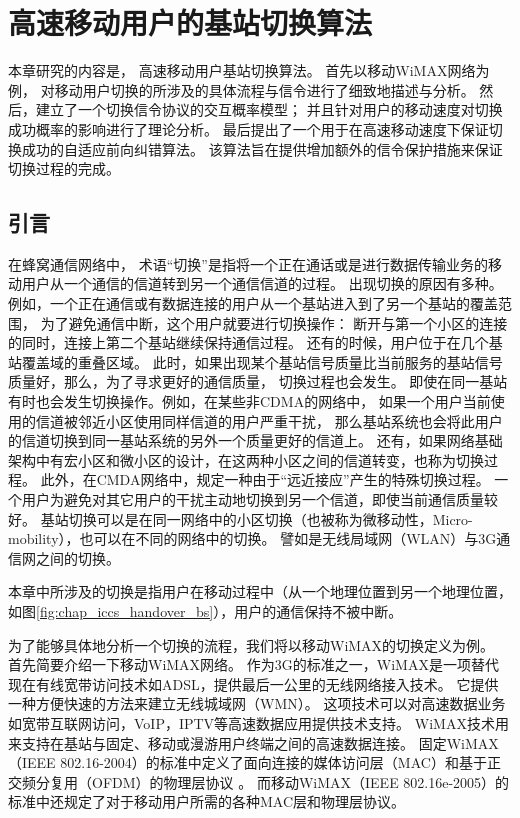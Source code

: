 \graphicspath{ {../body/handover_figures/}}
\chapter{高速移动用户的基站切换算法}
\label{chap_iccs_handover_alogrithm}
本章研究的内容是，
高速移动用户基站切换算法。
首先以移动WiMAX网络为例，
对移动用户切换的所涉及的具体流程与信令进行了细致地描述与分析。
然后，建立了一个切换信令协议的交互概率模型；
并且针对用户的移动速度对切换成功概率的影响进行了理论分析。
最后提出了一个用于在高速移动速度下保证切换成功的自适应前向纠错算法。
该算法旨在提供增加额外的信令保护措施来保证切换过程的完成。


\section{引言}
\label{section_iccs_handover_algorithm_introduction}
在蜂窝通信网络中，
术语“切换”是指将一个正在通话或是进行数据传输业务的移动用户从一个通信的信道转到另一个通信信道的过程。
出现切换的原因有多种。
例如，一个正在通信或有数据连接的用户从一个基站进入到了另一个基站的覆盖范围，
为了避免通信中断，这个用户就要进行切换操作：
断开与第一个小区的连接的同时，连接上第二个基站继续保持通信过程。
还有的时候，用户位于在几个基站覆盖域的重叠区域。
此时，如果出现某个基站信号质量比当前服务的基站信号质量好，那么，为了寻求更好的通信质量，
切换过程也会发生。
即使在同一基站有时也会发生切换操作。例如，在某些非CDMA的网络中，
如果一个用户当前使用的信道被邻近小区使用同样信道的用户严重干扰，
那么基站系统也会将此用户的信道切换到同一基站系统的另外一个质量更好的信道上。
还有，如果网络基础架构中有宏小区和微小区的设计，在这两种小区之间的信道转变，也称为切换过程。
此外，在CMDA网络中，规定一种由于“远近接应”产生的特殊切换过程。
一个用户为避免对其它用户的干扰主动地切换到另一个信道，即使当前通信质量较好。
基站切换可以是在同一网络中的小区切换（也被称为微移动性，Micro-mobility），也可以在不同的网络中的切换。
譬如是无线局域网（WLAN）与3G通信网之间的切换。

本章中所涉及的切换是指用户在移动过程中（从一个地理位置到另一个地理位置，如图\ref{fig:chap_iccs_handover_bs}），用户的通信保持不被中断\cite{Pollini:1996:THD}\cite{Wright:ICMB2007}。

为了能够具体地分析一个切换的流程，我们将以移动WiMAX的切换定义为例。
首先简要介绍一下移动WiMAX网络。
作为3G的标准之一，WiMAX是一项替代现在有线宽带访问技术如ADSL，提供最后一公里的无线网络接入技术。
它提供一种方便快速的方法来建立无线城域网（WMN）。
这项技术可以对高速数据业务如宽带互联网访问，VoIP，IPTV等高速数据应用提供技术支持。
WiMAX技术用来支持在基站与固定、移动或漫游用户终端之间的高速数据连接。
固定WiMAX （IEEE 802.16-2004）的标准中定义了面向连接的媒体访问层（MAC）和基于正交频分复用（OFDM）的物理层协议 \cite{IEEE:802_16D:2005}。
而移动WiMAX（IEEE 802.16e-2005）的标准中还规定了对于移动用户所需的各种MAC层和物理层协议\cite{IEEE:802_16E:2006}。


